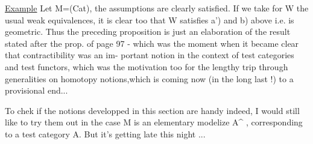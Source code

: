 \uline{Example} Let M=(Cat), the assumptions  are clearly satisfied. If we take
for W the usual weak equivalences, it is clear too that W  satisfies
a') and b) above i.e.  is geometric. Thus the preceding proposition is
just an elaboration of the result stated after the prop. of page 97 -
which was the moment when it became clear that contractibility was an im-%
portant notion in the context of test categories and test functors, 
which was the  motivation too for the  lengthy trip through generalities on
homotopy notions,which is coming now (in the long last !) to a provisional
end...

To chek if the notions developped in this section are handy indeed,
I would still like to try them out in the case M is an elementary modelize
A\^{} , corresponding to a test category A. But it's getting late this
night ...

